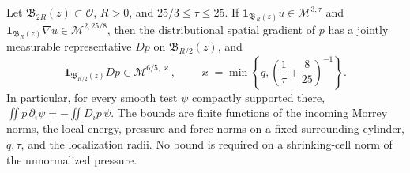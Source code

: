 \documentclass[11pt,reqno]{amsart}
\begin{document}
\begin{lemma}\label{lem:pressure-gradient-morrey}
Let $\mathfrak B_{2R}(z)\subset\mathcal O$, $R>0$, and
$25/3\le\tau\le25$. If
$\mathbf1_{\mathfrak B_R(z)}u\in\mathcal M^{3,\tau}$ and
$\mathbf1_{\mathfrak B_R(z)}\nabla u\in\mathcal M^{2,25/8}$, then the
distributional spatial gradient of $p$ has a jointly measurable representative
$Dp$ on $\mathfrak B_{R/2}(z)$, and
\begin{equation}\label{eq:pressure-gradient-morrey}
 \mathbf1_{\mathfrak B_{R/2}(z)}Dp\in\mathcal M^{6/5,\varkappa},
 \qquad \varkappa=\min\left\{q,\left(\frac1\tau+\frac8{25}\right)^{-1}\right\}.
\end{equation}
In particular, for every smooth test $\psi$ compactly supported there,
$\iint p\,\partial_i\psi=-\iint D_i p\,\psi$. The bounds are finite
functions of the incoming Morrey norms, the local energy, pressure and force
norms on a fixed surrounding cylinder, $q,\tau$, and the localization radii.
No bound is required on a shrinking-cell norm of the unnormalized pressure.
\end{lemma}
\end{document}
